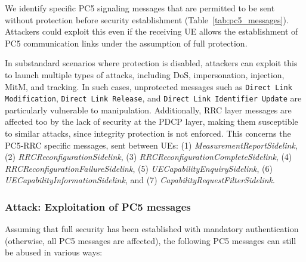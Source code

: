 We identify specific PC5 signaling messages that are permitted to be sent without protection before security establishment (Table~\ref{tab:pc5_messages}). Attackers could exploit this even if the receiving UE allows the establishment of PC5 communication links under the assumption of full protection.

In substandard scenarios where protection is disabled, attackers can exploit this to launch multiple types of attacks, including DoS, impersonation, injection, MitM, and tracking. In such cases, unprotected messages such as \texttt{Direct Link Modification}, \texttt{Direct Link Release}, and \texttt{Direct Link Identifier Update} are particularly vulnerable to manipulation. Additionally, RRC layer messages are affected too by the lack of security at the PDCP layer, making them susceptible to similar attacks, since integrity protection is not enforced. This concerns the PC5-RRC specific messages, sent between UEs: (1) \textit{MeasurementReportSidelink}, (2) \textit{RRCReconfigurationSidelink}, (3) \textit{RRCReconfigurationCompleteSidelink}, (4) \textit{RRCReconfigurationFailureSidelink}, (5) \textit{UECapabilityEnquirySidelink}, (6) \textit{UECapabilityInformationSidelink}, and (7) \textit{CapabilityRequestFilterSidelink}.

\subsubsection{Attack: Exploitation of PC5 messages}

Assuming that full security has been established with mandatory authentication (otherwise, all PC5 messages are affected), the following PC5 messages can still be abused in various ways:

